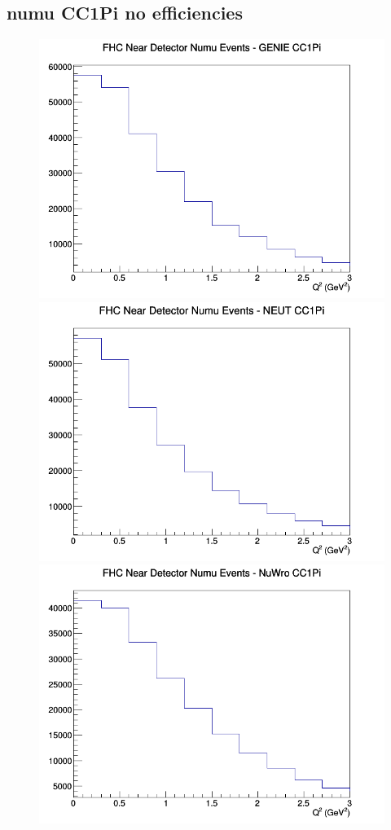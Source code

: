 \documentclass[12pt]{article}
\begin{document}
\subsection{numu CC1Pi no efficiencies}
\begin{figure}[h]
\includegraphics[width=\linewidth]{Q2/nominal/CC1Pi_FHC_ND_numu_Q2_GENIE.png}
\endminipage
{}
\includegraphics[width=\linewidth]{Q2/nominal/CC1Pi_FHC_ND_numu_Q2_NEUT.png}
\endminipage
{}
\includegraphics[width=\linewidth]{Q2/nominal/CC1Pi_FHC_ND_numu_Q2_NuWro.png}

\end{figure}
\end{document}
